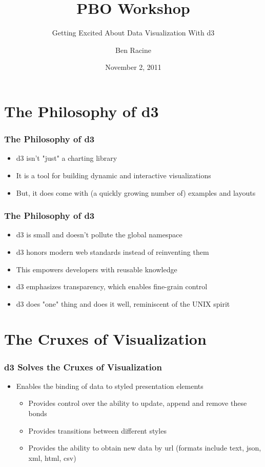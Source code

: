 \documentclass{beamer}
\title{PBO Workshop}
\subtitle{Getting Excited About Data Visualization With d3}
\author{Ben Racine \inst{1} }
\institute{\inst{1} Cornerstone Systems NW }
\date{November 2, 2011}
\begin{document}
\begin{frame}
    \frametitle{}
    \titlepage
\end{frame}



\section{The Philosophy of d3}



\begin{frame}
\frametitle{The Philosophy of d3}
\begin{itemize}
\pause
\item d3 isn't "just" a charting library
\pause
\item It is a tool for building dynamic and interactive visualizations
\pause
\item But, it does come with (a quickly growing number of) examples and layouts
\end{itemize}
\end{frame}



\begin{frame}
\frametitle{The Philosophy of d3}
\begin{itemize}
\pause
\item d3 is small and doesn't pollute the global namespace
\pause
\item d3 honors modern web standards instead of reinventing them
\pause
\item This empowers developers with reusable knowledge
\pause
\item d3 emphasizes transparency, which enables fine-grain control
\pause
\item d3 does "one" thing and does it well, reminiscent of the UNIX spirit
\end{itemize}
\end{frame}




\section{The Cruxes of Visualization}


\begin{frame}
\frametitle{d3 Solves the Cruxes of Visualization}
\begin{itemize}
\pause
\item Enables the binding of data to styled presentation elements 
    \begin{itemize}
    \pause
    \item Provides control over the ability to update, append and remove these bonds
    \pause
    \item Provides transitions between different styles
    \pause
    \item Provides the ability to obtain new data by url (formats include text, json, xml, html, csv)
    \end{itemize}
\end{itemize}
\end{frame}
\end{document}
